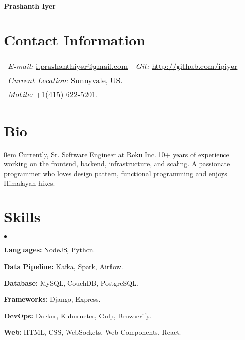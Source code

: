 \documentclass[margin, line, 10pt]{res}
\newenvironment{list2}{
  \begin{list}{$\bullet$}{%
      \setlength{\itemsep}{0in}
      \setlength{\parsep}{0in} \setlength{\parskip}{0in}
      \setlength{\topsep}{0in} \setlength{\partopsep}{0in}
      \setlength{\leftmargin}{0.2in}}}{\end{list}}
\begin{document}
 \textbf{\LARGE Prashanth Iyer}
\vspace{.1cm} \\
\begin{resume}

\section{Contact Information}
\vspace{.05in}
\begin{tabular}{@{}p{3in}p{3in}}
{\it E-mail:} \href{mailto:i.prashanthiyer@gmail.com}{i.prashanthiyer@gmail.com} & {\it Git:} \href{http://github.com/ipiyer}{http://github.com/ipiyer} \\
{\it Current Location:} Sunnyvale, US. \\
{\it Mobile:}  +1(415) 622-5201.
\end{tabular}

\section{Bio}
\begin{addmargin}{0em}
Currently, Sr. Software Engineer at Roku Inc. 10+ years of experience working on the frontend, backend, infrastructure, and scaling. A passionate programmer who loves design pattern, functional programming and enjoys Himalayan hikes.\\
\end{addmargin}
\vspace{-.15in}

\section{Skills}
\begin{list2}
\item {\bf Languages:} NodeJS, Python.\\
  \vspace{-.3cm}
\item {\bf Data Pipeline:} Kafka, Spark, Airflow.\\
  \vspace{-.3cm}
\item {\bf Database:} MySQL, CouchDB, PostgreSQL.\\
  \vspace{-.3cm}
\item {\bf Frameworks:} Django, Express.\\
  \vspace{-.3cm}
\item {\bf DevOps:} Docker, Kubernetes, Gulp, Browserify.\\
  \vspace{-.3cm}
\item {\bf Web:} HTML, CSS, WebSockets, Web Components, React.\\
  \vspace{-.3cm}
\end{list2}


\end{resume}
\end{document}
